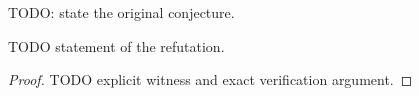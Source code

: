 %

TODO: state the original conjecture.

\begin{theorem}\label{thm:TODO}
TODO statement of the refutation.
\end{theorem}
\begin{proof}
TODO explicit witness and exact verification argument.
\end{proof}
